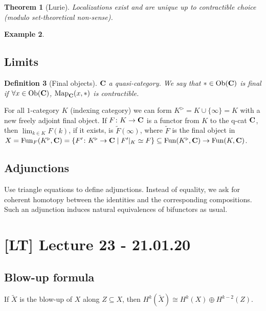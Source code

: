 \documentclass[A4paper, british, reqno]{amsart}
\theoremstyle{darkgreentheorem}
\newtheorem{thm}{Theorem}[section]
\theoremstyle{darkbluedefinition}
\newtheorem{defn}[thm]{Definition}
\theoremstyle{darkredexample}
\newtheorem{exa}[thm]{Example}
\theoremstyle{remark}
\DeclareMathOperator{\Fun}{Fun}
\DeclareMathOperator{\Ob}{Ob}
\DeclareMathOperator{\Map}{Map}
\newcommand{\QCat}{\mathbf{QCat}}
\newcommand{\1}{\mathbbm{1}}
\newcommand{\op}{\oplus}
\newcommand{\sub}{\subseteq}
\begin{document}
\begin{thm}[Lurie]
    Localizations exist and are unique up to contractible choice (modulo set-theoretical non-sense).
\end{thm}

\begin{exa}
    \begin{center}
    \end{center}
\end{exa}

\subsection{Limits}

\begin{defn}[Final objects]
    $\mathbf{C}$ a quasi-category.
    We say that $*\in \Ob(\bfC)$ is \textit{final} if $\forall x\in \Ob(\bfC)$, $\Map_{\bfC}(x,*)$ is contractible.
\end{defn}

For all $1$-category $K$ (indexing category) we can form $K^{\triangleright}=K\cup \{\infty\}=K$ with a new freely adjoint final object.
If $F\colon K\to \mathbf{C}$ is a functor from $K$ to the q-cat $\mathbf{C}$, then $\lim_{k\in K}F(k)$, if it exists, is $\tilde{F}(\infty)$, where $\tilde{F}$ is the final object in $X=\Fun_{F}(K^{\triangleright},\bfC)=\{F'\colon K^{\triangleright}\to \bfC \mid F'|_{K}\simeq F\}\sub\Fun(K^{\triangleright},\bfC)\to \Fun(K,\bfC)$.

\subsection{Adjunctions}
Use triangle equations to define adjunctions.
Instead of equality, we ask for coherent homotopy between the identities and the corresponding compositions.
Such an adjunction induces natural equivalences of bifunctors as usual.

\section{[LT] Lecture 23 - 21.01.20}

\subsection{Blow-up formula}
If $\tilde{X}$ is the blow-up of $X$ along $Z\sub X$, then $H^{k}(\tilde{X})\cong H^{k}(X)\op H^{k-2}(Z)$.
\end{document}
